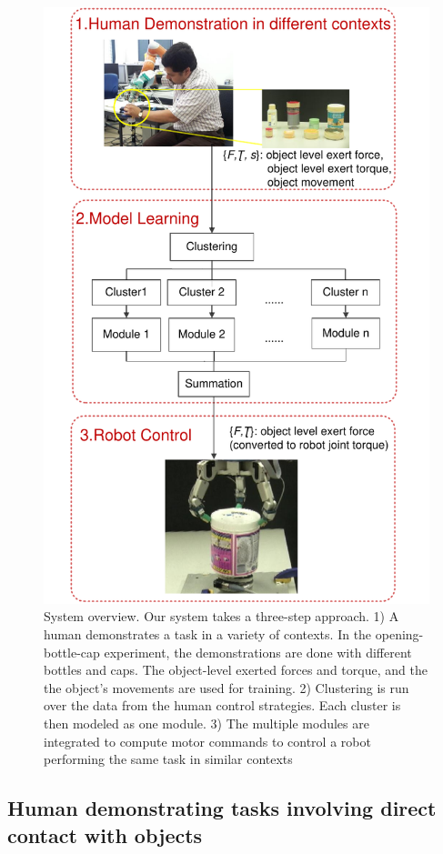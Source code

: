 \begin{figure}
  \centering
   \includegraphics[width=12cm]{./fig_cha4/overview3.pdf}
  \caption{   {System overview. Our system takes a
       three-step approach. 1) A human demonstrates a task in a
       variety of contexts. In the opening-bottle-cap experiment, the
       demonstrations are done with different bottles and caps. The
       object-level exerted forces and torque, and the the object's
       movements are used for training. 2) Clustering is run over the data from the human control
       strategies. Each cluster is then modeled as one module. 3) The
       multiple modules are integrated to compute motor commands to
       control a robot performing the same task in similar contexts}
  \label{fig:overview}
}
\label{fig:demo}
\end{figure}

\subsection{Human demonstrating tasks involving direct contact with objects}
\label{cha4:sec2:demo}


